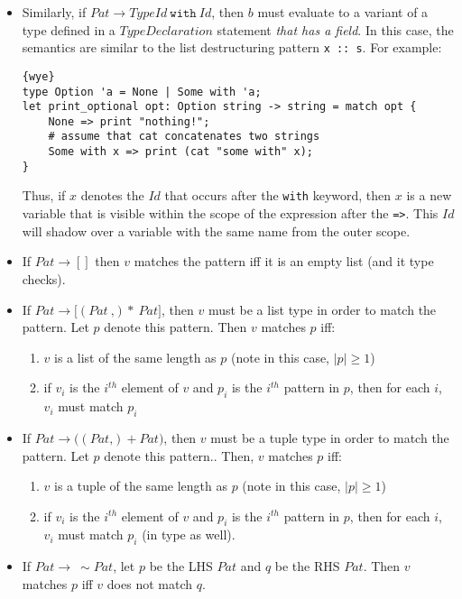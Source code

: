 \documentclass[a4paper, 12pt]{article}
\begin{document}
\begin{itemize}
\begin{lstlisting}{wye}
type Operation = Add | Sub | Mul | Div;
let to_string op: Operation -> string = match op {
	Add => "add";
	Sub => "subtract";
	Mul => "multiply";
	Div => "divide"
}
let x = Operation.Mul;
let v = to_string x; # v is "multiply"
\end{lstlisting}
\item Similarly, if $Pat \to TypeId\:\texttt{with}\: Id$, then $b$ must evaluate to a variant of a type defined in a $TypeDeclaration$ statement \textit{that has a field}. In this case, the semantics are similar to the list destructuring pattern \texttt{x :: s}. For example:
\begin{lstlisting}{wye}
type Option 'a = None | Some with 'a;
let print_optional opt: Option string -> string = match opt {
	None => print "nothing!";
	# assume that cat concatenates two strings
	Some with x => print (cat "some with" x);
}
\end{lstlisting}
Thus, if $x$ denotes the $Id$ that occurs after the \texttt{with} keyword, then $x$ is a new variable that is visible within the scope of the expression after the \texttt{=>}. This $Id$ will shadow over a variable with the same name from the outer scope.
\item If $Pat \to []$ then $v$ matches the pattern iff it is an empty list (and it type checks).
\item If $Pat \to \texttt{[}(Pat\: \texttt{,})*\: Pat\texttt{]}$, then $v$ must be a list type in order to match the pattern. Let $p$ denote this pattern. Then $v$ matches $p$ iff:
\begin{enumerate}
\item $v$ is a list of the same length as $p$ (note in this case, $|p| \geq 1$)
\item if $v_i$ is the $i^{th}$ element of $v$ and $p_i$ is the $i^{th}$ pattern in $p$, then for each $i$, $v_i$ must match $p_i$
\end{enumerate}
\item If $Pat \to \texttt{(}(Pat\texttt{,})+ Pat\texttt{)}$, then $v$ must be a tuple type in order to match the pattern. Let $p$ denote this pattern.. Then, $v$ matches $p$ iff:
\begin{enumerate}
\item $v$ is a tuple of the same length as $p$ (note in this case, $|p| \geq 1$)
\item if $v_i$ is the $i^{th}$ element of $v$ and $p_i$ is the $i^{th}$ pattern in $p$, then for each $i$, $v_i$ must match $p_i$ (in type as well).
\end{enumerate}
\item If $Pat\to\:\sim Pat$, let $p$ be the LHS $Pat$ and $q$ be the RHS $Pat$. Then $v$ matches $p$ iff $v$ does not match $q$.
\end{itemize}
\end{document}
